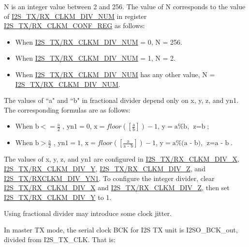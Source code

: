 \documentclass[main\_\_EN.tex]{subfiles}
\begin{document}
N is an integer value between 2 and 256. The value of N corresponds to the value of  \hyperref[fielddesc:I2STXCLKMDIVNUM]{I2S\_TX/RX\_CLKM\_DIV\_NUM} in register  \hyperref[regdesc:I2STXCLKMCONFREG]{I2S\_TX/RX\_CLKM\_CONF\_REG} as follows:

\begin{itemize}
    \item When  \hyperref[fielddesc:I2STXCLKMDIVNUM]{I2S\_TX/RX\_CLKM\_DIV\_NUM} = 0, N = 256.
    \item When  \hyperref[fielddesc:I2STXCLKMDIVNUM]{I2S\_TX/RX\_CLKM\_DIV\_NUM} = 1, N = 2.
    \item When  \hyperref[fielddesc:I2STXCLKMDIVNUM]{I2S\_TX/RX\_CLKM\_DIV\_NUM} has any other value, N =  \hyperref[fielddesc:I2STXCLKMDIVNUM]{I2S\_TX/RX\_CLKM\_DIV\_NUM}.

\end{itemize}

The values of ``a" and ``b" in fractional divider depend only on x, y, z, and yn1. The corresponding formulas are as follows:

\begin{itemize}
    \item When $\textrm{b} <= \frac{\textrm{a}}{2}$ , $\textrm{yn1} = 0$, $\textrm{x} = floor([\frac{\textrm{a}}{\textrm{b}}]) - 1$, $\textrm{y} = \textrm{a}\%\textrm{b}$, $\textrm{z} = \textrm{b}$; 
    \item When $\textrm{b} > \frac{\textrm{a}}{2}$ , $\textrm{yn1}=1$, $\textrm{x} = floor([\frac{\textrm{a}}{\textrm{a - b}}]) - 1$, $\textrm{y} = \textrm{a}\%\textrm{(a - b)}$, $\textrm{z}=\textrm{a - b}$.
\end{itemize}

The values of x, y, z, and yn1 are configured in \hyperref[fielddesc:I2STXCLKMDIVX]{I2S\_TX/RX\_CLKM\_DIV\_X}, \hyperref[fielddesc:I2STXCLKMDIVY]{I2S\_TX/RX\_CLKM\_DIV\_Y}, \hyperref[fielddesc:I2STXCLKMDIVZ]{I2S\_TX/RX\_CLKM\_DIV\_Z}, and \hyperref[fielddesc:I2STXCLKMDIVYN1]{I2S\_TX/RXCLKM\_DIV\_YN1}.
To configure the integer divider, clear \hyperref[fielddesc:I2STXCLKMDIVX]{I2S\_TX/RX\_CLKM\_DIV\_X} and \hyperref[fielddesc:I2STXCLKMDIVZ]{I2S\_TX/RX\_CLKM\_DIV\_Z}, then set \hyperref[fielddesc:I2STXCLKMDIVY]{I2S\_TX/RX\_CLKM\_DIV\_Y} to 1.


\begin{tiplisting}
Using fractional divider may introduce some clock jitter.
\end{tiplisting}


In master TX mode, the serial clock BCK for I2S TX unit is I2SO\_BCK\_out, divided from I2S\_TX\_CLK. That is:
\end{document}
